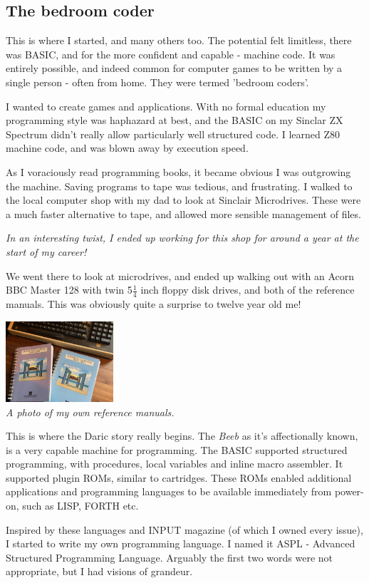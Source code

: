 \documentclass[10pt]{book}
\newcommand{\Daric}{Daric}
\begin{document}
\subsection{The bedroom coder}
\par{This is where I started, and many others too. The potential felt limitless, there was BASIC, and for the more confident and capable - machine code. It was entirely possible, and indeed common for computer games to be written by a single person - often from home. They were termed 'bedroom coders'.}
\par{I wanted to create games and applications. With no formal education my programming style was haphazard at best, and the BASIC on my Sinclar ZX Spectrum didn't really allow particularly well structured code. I learned Z80 machine code, and was blown away by execution speed.}
\par{As I voraciously read programming books, it became obvious I was outgrowing the machine. Saving programs to tape was tedious, and frustrating. I walked to the local computer shop with my dad to look at Sinclair Microdrives. These were a much faster alternative to tape, and allowed more sensible management of files.}
\par{\emph{In an interesting twist, I ended up working for this shop for around a year at the start of my career!}}
\par{We went there to look at microdrives, and ended up walking out with an Acorn BBC Master 128 with twin 5$\frac{1}{4}$ inch floppy disk drives, and both of the reference manuals. This was obviously quite a surprise to twelve year old me! }
\begin{center}
\includegraphics[height=3cm]{Photo 08-02-2022, 11 46 37.jpg}\\
\scriptsize{\emph{A photo of my own reference manuals.}}
\end{center}
\par{This is where the \Daric{} story really begins. The \emph{Beeb} as it's affectionally known, is a very capable machine for programming. The BASIC supported structured programming, with procedures, local variables and inline macro assembler. It supported plugin ROMs, similar to cartridges. These ROMs enabled additional applications and programming languages to be available immediately from power-on, such as LISP, FORTH etc.}
\par{Inspired by these languages and INPUT magazine (of which I owned every issue), I started to write my own programming language. I named it ASPL - Advanced Structured Programming Language. Arguably the first two words were not appropriate, but I had visions of grandeur.}
\end{document}
